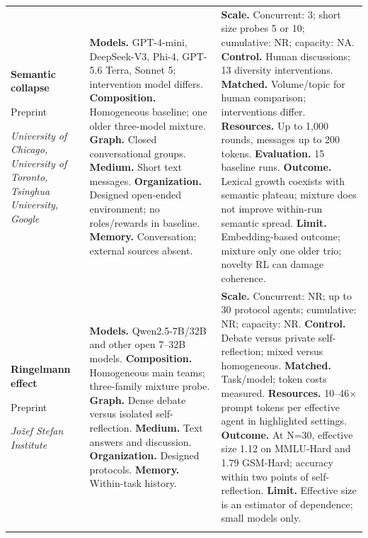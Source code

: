 \begin{longtable}{@{}>{\raggedright\arraybackslash}p{}>{\raggedright\arraybackslash}p{}>{\raggedright\arraybackslash}p{}@{}}
\textbf{Semantic collapse}\par \citep{semantic-collapse}\par Preprint\par\emph{University of Chicago, University of Toronto, Tsinghua University, Google} & \textbf{Models.} GPT-4-mini, DeepSeek-V3, Phi-4, GPT-5.6 Terra, Sonnet 5; intervention model differs. \textbf{Composition.} Homogeneous baseline; one older three-model mixture. \textbf{Graph.} Closed conversational groups. \textbf{Medium.} Short text messages. \textbf{Organization.} Designed open-ended environment; no roles/rewards in baseline. \textbf{Memory.} Conversation; external sources absent. & \textbf{Scale.} Concurrent: 3; short size probes 5 or 10; cumulative: NR; capacity: NA. \textbf{Control.} Human discussions; 13 diversity interventions. \textbf{Matched.} Volume/topic for human comparison; interventions differ. \textbf{Resources.} Up to 1,000 rounds, messages up to 200 tokens. \textbf{Evaluation.} 15 baseline runs. \textbf{Outcome.} Lexical growth coexists with semantic plateau; mixture does not improve within-run semantic spread. \textbf{Limit.} Embedding-based outcome; mixture only one older trio; novelty RL can damage coherence. \\ \addlinespace[5pt]
\textbf{Ringelmann effect}\par \citep{ringelmann-effect}\par Preprint\par\emph{Jožef Stefan Institute} & \textbf{Models.} Qwen2.5-7B/32B and other open 7--32B models. \textbf{Composition.} Homogeneous main teams; three-family mixture probe. \textbf{Graph.} Dense debate versus isolated self-reflection. \textbf{Medium.} Text answers and discussion. \textbf{Organization.} Designed protocols. \textbf{Memory.} Within-task history. & \textbf{Scale.} Concurrent: NR; up to 30 protocol agents; cumulative: NR; capacity: NR. \textbf{Control.} Debate versus private self-reflection; mixed versus homogeneous. \textbf{Matched.} Task/model; token costs measured. \textbf{Resources.} 10--46$\times$ prompt tokens per effective agent in highlighted settings. \textbf{Outcome.} At N=30, effective size 1.12 on MMLU-Hard and 1.79 GSM-Hard; accuracy within two points of self-reflection. \textbf{Limit.} Effective size is an estimator of dependence; small models only. \\ \addlinespace[5pt]

\end{longtable}
